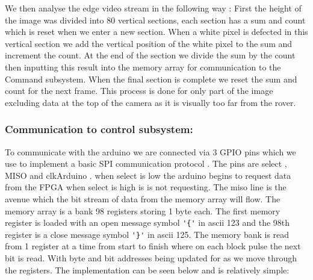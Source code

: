 \documentclass[10pt,twoside]{article}
\begin{document}
We then analyse the edge video stream in the following way : First the height of the image was divided into  80 vertical sections, each section has a sum and count which is reset when we enter a new section. When a white pixel is defected in this vertical section we add the vertical position of the white pixel to the sum and increment the count. At the end of the section we divide the sum by the count then inputting this result into the memory array for communication to the Command subsystem. When the final section is complete we reset the sum and count for the next frame. This process is done for only part of the image excluding data at the top of the camera as it is visually too far from the rover. 

\subsubsection{Communication to control subsystem:}

To communicate with the arduino we are connected via 3 GPIO pins which we use to implement a basic SPI communication protocol  . The pins are select , MISO and clkArduino . when select is low the arduino begins to request data from the FPGA when select is high is is not requesting. The miso line is the avenue which the bit stream of data from the memory array will flow. The memory array is a bank 98 registers storing 1 byte each. The first memory register is loaded with an open message symbol \verb|'{'| in ascii 123 and the 98th register is a close message symbol \verb|'}'| in ascii 125. The memory bank is read from 1 register at a time from start to finish where on each block pulse the next bit is read. With byte and bit addresses being updated for as we move through the registers. The implementation can be seen below and is relatively simple: 
\end{document}
